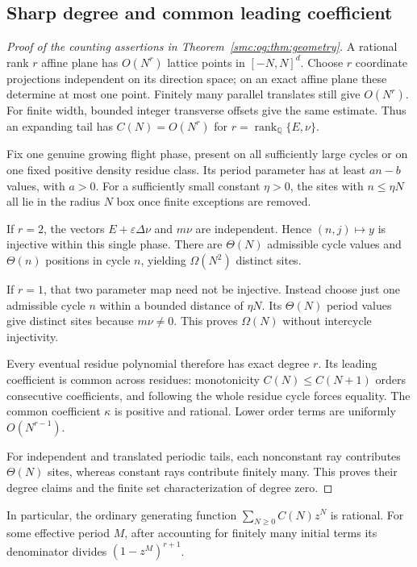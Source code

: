 \documentclass[11pt,letterpaper]{article}
\numberwithin{equation}{section}
\theoremstyle{definition}
\theoremstyle{remark}
\newcommand{\Q}{\mathbb Q}
\newcommand{\rank}{\operatorname{rank}}
\begin{document}
\subsection{Sharp degree and common leading coefficient}
\begin{proof}[Proof of the counting assertions in Theorem~\ref{smc:og:thm:geometry}]
A rational rank $r$ affine plane has $O(N^r)$ lattice points in $[-N,N]^d$. Choose $r$ coordinate projections independent on its direction space; on an exact affine plane these determine at most one point. Finitely many parallel translates still give $O(N^r)$. For finite width, bounded integer transverse offsets give the same estimate. Thus an expanding tail has $C(N)=O(N^r)$ for $r=\rank_\Q\{E,\nu\}$.

Fix one genuine growing flight phase, present on all sufficiently large cycles or on one fixed positive density residue class. Its period parameter has at least $an-b$ values, with $a>0$. For a sufficiently small constant $\eta>0$, the sites with $n\le\eta N$ all lie in the radius $N$ box once finite exceptions are removed.

If $r=2$, the vectors $E+\varepsilon\Delta\nu$ and $m\nu$ are independent. Hence $(n,j)\mapsto y$ is injective within this single phase. There are $\Theta(N)$ admissible cycle values and $\Theta(n)$ positions in cycle $n$, yielding $\Omega(N^2)$ distinct sites.

If $r=1$, that two parameter map need not be injective. Instead choose just one admissible cycle $n$ within a bounded distance of $\eta N$. Its $\Theta(N)$ period values give distinct sites because $m\nu\ne0$. This proves $\Omega(N)$ without intercycle injectivity.

Every eventual residue polynomial therefore has exact degree $r$. Its leading coefficient is common across residues: monotonicity $C(N)\le C(N+1)$ orders consecutive coefficients, and following the whole residue cycle forces equality. The common coefficient $\kappa$ is positive and rational. Lower order terms are uniformly $O(N^{r-1})$.

For independent and translated periodic tails, each nonconstant ray contributes $\Theta(N)$ sites, whereas constant rays contribute finitely many. This proves their degree claims and the finite set characterization of degree zero.
\end{proof}
In particular, the ordinary generating function $\sum_{N\ge0}C(N)z^N$ is rational. For some effective period $M$, after accounting for finitely many initial terms its denominator divides $(1-z^M)^{r+1}$.
\end{document}
